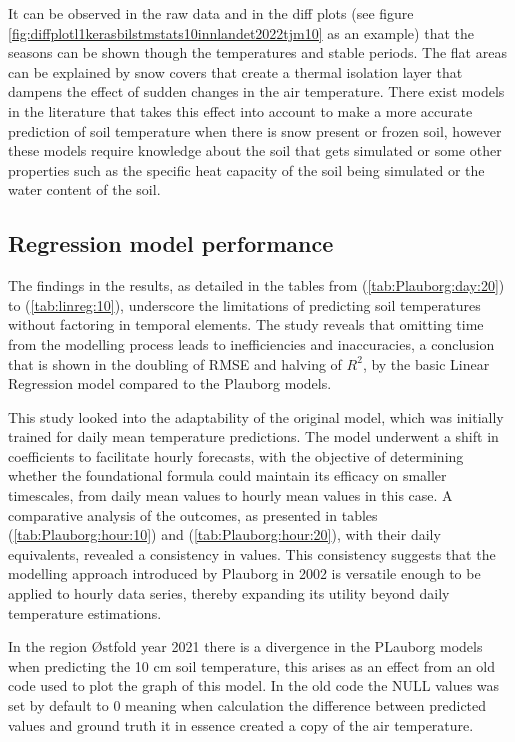 It can be observed in the raw data and in the diff plots (see figure \ref{fig:diffplotl1kerasbilstmstats10innlandet2022tjm10} as an example) that the seasons can be shown though the temperatures and stable periods. The flat areas can be explained by snow covers that create a thermal isolation layer that dampens the effect of sudden changes in the air temperature. There exist models in the literature that takes this effect into account\cite{rankinen_simple_2004,stuurop_simulating_2021} to make a more accurate prediction of soil temperature when there is snow present or frozen soil, however these models require knowledge about the soil that gets simulated or some other properties such as the specific heat capacity of the soil being simulated or the water content of the soil. 

\subsection{Regression model performance}

The findings in the results, as detailed in the tables from (\ref{tab:Plauborg:day:20}) to (\ref{tab:linreg:10}), underscore the limitations of predicting soil temperatures without factoring in temporal elements. The study reveals that omitting time from the modelling process leads to inefficiencies and inaccuracies, a conclusion that is shown in the doubling of RMSE and halving of $R^2$, by the basic Linear Regression model compared to the Plauborg models.

This study looked into the adaptability of the original model, which was initially trained for daily mean temperature predictions. The model underwent a shift in coefficients to facilitate hourly forecasts, with the objective of determining whether the foundational formula could maintain its efficacy on smaller timescales, from daily mean values to hourly mean values in this case. A comparative analysis of the outcomes, as presented in tables (\ref{tab:Plauborg:hour:10}) and (\ref{tab:Plauborg:hour:20}), with their daily equivalents, revealed a consistency in values. This consistency suggests that the modelling approach introduced by Plauborg in 2002 \cite{plauborg_simple_2002} is versatile enough to be applied to hourly data series, thereby expanding its utility beyond daily temperature estimations.

In the region Østfold year 2021 there is a divergence in the PLauborg models when predicting the 10 cm soil temperature, this arises as an effect from an old code used to plot the graph of this model. In the old code the NULL values was set by default to 0 meaning when calculation the difference between predicted values and ground truth it in essence created a copy of the air temperature.

